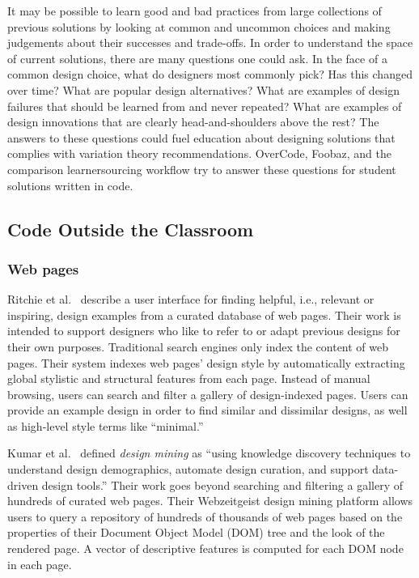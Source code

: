 It may be possible to learn good and bad practices from large collections of previous solutions by looking at common and uncommon choices and making judgements about their successes and trade-offs. In order to understand the space of current solutions, there are many questions one could ask. In the face of a common design choice, what do designers most commonly pick? Has this changed over time? What are popular design alternatives? What are examples of design failures that should be learned from and never repeated? What are examples of design innovations that are clearly head-and-shoulders above the rest? The answers to these questions could fuel education about designing solutions that complies with variation theory recommendations. OverCode, Foobaz, and the comparison learnersourcing workflow try to answer these questions for student solutions written in code.


\subsection{Code Outside the Classroom}

\subsubsection{Web pages}
Ritchie et al.~\cite{ritchie2011d} describe a user interface for finding helpful, i.e., relevant or inspiring, design examples from a curated database of web pages. Their work is intended to support designers who like to refer to or adapt previous designs for their own purposes. Traditional search engines only index the content of web pages. Their system indexes web pages' design style by automatically extracting global stylistic and structural features from each page. Instead of manual browsing, users can search and filter a gallery of design-indexed pages. Users can provide an example design in order to find similar and dissimilar designs, as well as high-level style terms like ``minimal.''

Kumar et al.~\cite{webzeitgeist} defined {\it design mining} as ``using knowledge discovery techniques to understand design demographics, automate design curation, and support data-driven design tools.'' Their work goes beyond searching and filtering a gallery of hundreds of curated web pages. Their Webzeitgeist design mining platform allows users to query a repository of hundreds of thousands of web pages based on the properties of their Document Object Model (DOM) tree and the look of the rendered page. A vector of descriptive features is computed for each DOM node in each page.

